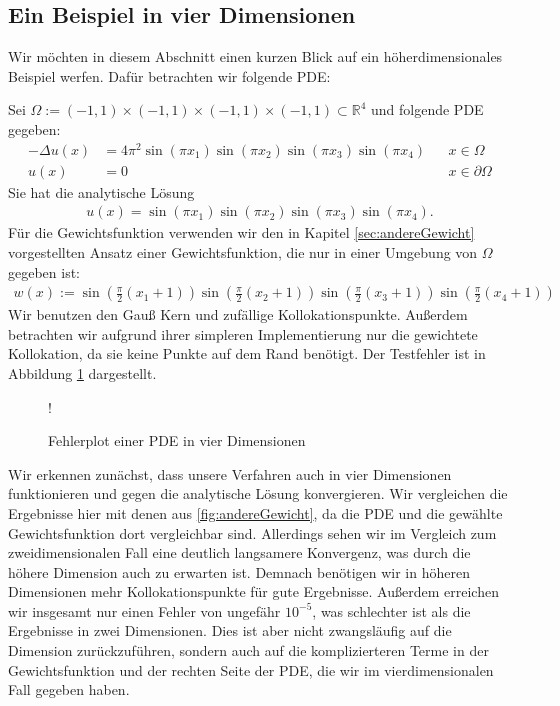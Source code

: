 \subsection{Ein Beispiel in vier Dimensionen}
\label{sec:4D}
Wir möchten in diesem Abschnitt einen kurzen Blick auf ein höherdimensionales Beispiel werfen. Dafür betrachten wir folgende \ac{PDE}:

Sei $\Omega := (-1,1) \times (-1,1) \times (-1,1) \times (-1,1) \subset \mathbb{R}^4$ und folgende \ac{PDE} gegeben:
\begin{align*}
- \Delta u(x) &= 4\pi^2 \sin(\pi x_1)\sin(\pi x_2)\sin(\pi x_3)\sin(\pi x_4)&& x \in \Omega\\
u(x) &= 0&& x \in \partial \Omega
\end{align*}
Sie hat die analytische Lösung 
\begin{align*}
u(x) = \sin(\pi x_1)\sin(\pi x_2)\sin(\pi x_3)\sin(\pi x_4).
\end{align*}
Für die Gewichtsfunktion verwenden wir den in Kapitel \ref{sec:andereGewicht} vorgestellten Ansatz einer Gewichtsfunktion, die nur in einer Umgebung von $\Omega$ gegeben ist:
\begin{align*}
	w(x) := \sin\left(\frac{\pi}{2}(x_1+1)\right)\sin\left(\frac{\pi}{2}(x_2+1)\right) \sin\left(\frac{\pi}{2}(x_3+1)\right)\sin\left(\frac{\pi}{2}(x_4+1)\right)
\end{align*}
Wir benutzen den Gauß Kern und zufällige Kollokationspunkte. Außerdem betrachten wir aufgrund ihrer simpleren Implementierung nur die gewichtete Kollokation, da sie keine Punkte auf dem Rand benötigt. Der Testfehler ist in Abbildung \ref{fig:4dim} dargestellt.
\begin{figure}[ht]
	\centering
	\resizebox {.85\columnwidth} {!} {
		
	}
	\caption{Fehlerplot einer \acs{PDE} in vier Dimensionen}
	\label{fig:4dim}
\end{figure}

Wir erkennen zunächst, dass unsere Verfahren auch in vier Dimensionen funktionieren und gegen die analytische Lösung konvergieren. Wir vergleichen die Ergebnisse hier mit denen aus \ref{fig:andereGewicht}, da die \ac{PDE} und die gewählte Gewichtsfunktion dort vergleichbar sind. Allerdings sehen wir im Vergleich zum zweidimensionalen Fall eine deutlich langsamere Konvergenz, was durch die höhere Dimension auch zu erwarten ist. Demnach benötigen wir in höheren Dimensionen mehr Kollokationspunkte für gute Ergebnisse. Außerdem erreichen wir insgesamt nur einen Fehler von ungefähr $10^{-5}$, was schlechter ist als die Ergebnisse in zwei Dimensionen. Dies ist aber nicht zwangsläufig auf die Dimension zurückzuführen, sondern auch auf die komplizierteren Terme in der Gewichtsfunktion und der rechten Seite der \ac{PDE}, die wir im vierdimensionalen Fall gegeben haben.

